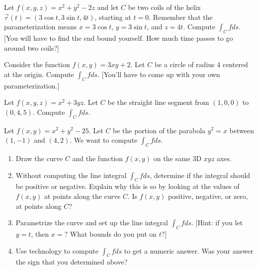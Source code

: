 \begin{problem}
%
%
  Let $f(x,y,z)=x^2+y^2-2z$ and let $C$ be two coils of the helix $\vec r(t)=(3\cos t, 3\sin t, 4t)$, starting at $t=0$. Remember that the parameterization means $x=3\cos t$, $y=3\sin t$, and $z=4t$.  Compute $\int_Cf ds$. [You will have to find the end bound yourself. How much time passes to go around two coils?]
\end{problem}

\begin{problem*}
%
%
 Consider the function $f(x,y)=3xy+2$. Let $C$ be a circle of radius 4 centered at the origin.  Compute $\int_C fds$.  [You'll have to come up with your own parameterization.]
\end{problem*}


\begin{problem*}%
%
 Let $f(x,y,z)=x^2+3yz$. Let $C$ be the straight line segment from $(1,0,0)$ to $(0,4,5)$. Compute $\int_C f ds$. 
\end{problem*}

\begin{problem}%
%
%
 Let $f(x,y)=x^2+y^2-25$. Let $C$ be the portion of the parabola $y^2=x$ between $(1,-1)$ and $(4,2)$. We want to compute $\int_C fds$.  
\begin{enumerate}
\item Draw the curve $C$ and the function $f(x,y)$ on the same 3D $xyz$ axes.
\item Without computing the line integral $\int_C fds$, determine if the integral should be positive or negative. Explain why this is so by looking at the values of $f(x,y)$ at points along the curve $C$.  Is $f(x,y)$ positive, negative, or zero, at points along $C$?
 \item Parametrize the curve and set up the line integral $\int_C f ds$. [Hint: if you let $y=t$, then $x=$? What bounds do you put on $t$?]
 \item Use technology to compute $\int_C fds$ to get a numeric answer.  Was your answer the sign that you determined above?
\end{enumerate}
\end{problem}


